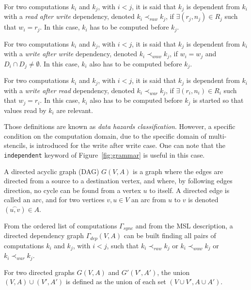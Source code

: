 \begin{mydef}
For two computations $k_i$ and $k_j$, with $i < j$, it is said that $k_j$ is dependent from $k_i$ with a \emph{read after write} dependency, denoted $k_i \prec_{raw} k_j$, if $\exists (r_j,n_j) \in R_j$ such that $w_i=r_j$. In this case, $k_i$ has to be computed before $k_j$.
\end{mydef}

\begin{mydef}
For two computations $k_i$ and $k_j$, with $i < j$, it is said that $k_j$ is dependent from $k_i$ with a \emph{write after write} dependency, denoted $k_i \prec_{waw} k_j$, if $w_i = w_j$ and $D_i \cap D_j \neq \emptyset$. In this case, $k_i$ also has to be computed before $k_j$.
\end{mydef}

\begin{mydef}
For two computations $k_i$ and $k_j$, with $i < j$, it is said that $k_j$ is dependent from $k_i$ with a \emph{write after read} dependency, denoted $k_i \prec_{war} k_j$, if $\exists (r_i,n_i) \in R_i$ such that $w_j=r_i$. In this case, $k_i$ also has to be computed before $k_j$ is started so that values read by $k_i$ are relevant.
\end{mydef}

Those definitions are known as \emph{data hazards classification}. However, a specific condition on the computation domain, due to the specific domain of multi-stencils, is introduced for the write after write case. One can note that the \texttt{independent} keyword of Figure~\ref{fig:grammar} is useful in this case.

\begin{mydef}
A directed acyclic graph (DAG) $G(V,A)$ is a graph where the edges are directed from a source to a destination vertex, and where, by following edges direction, no cycle can be found from a vertex $u$ to itself. A directed edge is called an arc, and for two vertices $v,u \in V$ an arc from $u$ to $v$ is denoted $(\overset{\frown}{u,v}) \in A$.
\end{mydef}

From the ordered list of computations $\Gamma_{sync}$ and from the MSL description, a directed dependency graph $\Gamma_{dep}(V,A)$ can be built finding all pairs of computations $k_i$ and $k_j$, with $i<j$, such that $k_i \prec_{raw} k_j$ or $k_i \prec_{waw} k_j$ or $k_i \prec_{war} k_j$. 

\begin{mydef}
For two directed graphs $G(V,A)$ and $G'(V',A')$, the union $(V,A)\cup (V',A')$ is defined as the union of each set $(V\cup V', A \cup A')$.
\end{mydef}

